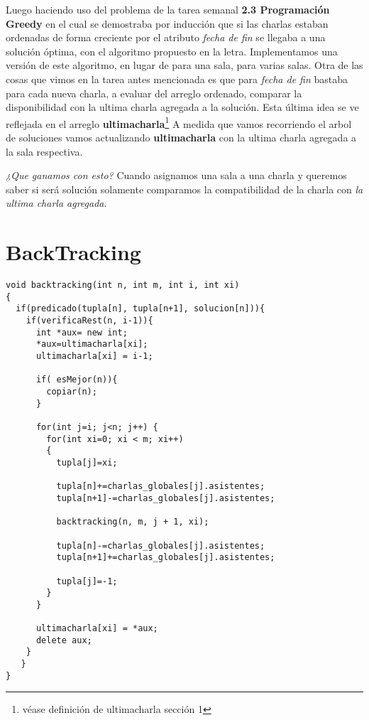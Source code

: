 \documentclass[11pt]{article}
\begin{document}
Luego haciendo uso del problema de la tarea semanal \textbf{2.3 Programación Greedy} en el cual se demostraba por inducción que si las charlas estaban ordenadas de forma creciente por el atributo \textit{fecha de fin} se llegaba a una solución óptima, con el algoritmo propuesto en la letra. \newline
Implementamos una versión de este algoritmo, en lugar de para una sala, para varias salas. \newline
Otra de las cosas que vimos en la tarea antes mencionada es que para \textit{ fecha de fin } bastaba para cada nueva charla, a evaluar del arreglo ordenado, comparar la disponibilidad con la ultima charla agregada a la solución.  \newline
Esta última idea se ve reflejada en el arreglo \textbf{ultimacharla}\footnote{véase definición de ultimacharla sección 1} \newline
A medida que vamos recorriendo el arbol de soluciones vamos actualizando \textbf{ultimacharla} con la ultima charla agregada a la sala respectiva.

\textit{¿Que ganamos con esto?} \newline
Cuando asignamos una sala a una charla y queremos saber si será solución solamente comparamos la compatibilidad de la charla con \textit{la ultima charla agregada}. \newpage

\section{BackTracking}

\begin{lstlisting}
void backtracking(int n, int m, int i, int xi)
{
  if(predicado(tupla[n], tupla[n+1], solucion[n])){
    if(verificaRest(n, i-1)){
	  int *aux= new int;
	  *aux=ultimacharla[xi];
	  ultimacharla[xi] = i-1;
	  
	  if( esMejor(n)){
	    copiar(n);
	  }

	  for(int j=i; j<n; j++) {
	    for(int xi=0; xi < m; xi++)
	    {
	      tupla[j]=xi;

	      tupla[n]+=charlas_globales[j].asistentes;
	      tupla[n+1]-=charlas_globales[j].asistentes;

	      backtracking(n, m, j + 1, xi);
					
	      tupla[n]-=charlas_globales[j].asistentes;
	      tupla[n+1]+=charlas_globales[j].asistentes;

	      tupla[j]=-1;
	    }
	  }

	  ultimacharla[xi] = *aux;
	  delete aux;
	}
   }
}
\end{lstlisting}
\end{document}

